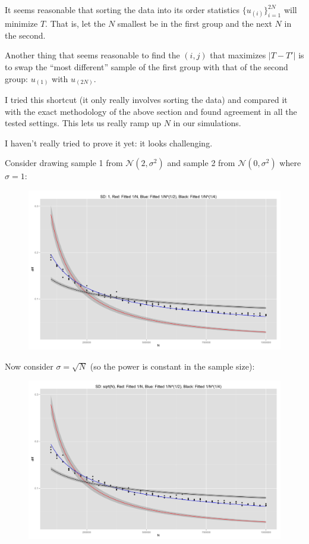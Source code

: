 It seems reasonable that sorting the data into its order statistics
$\{u_{(i)}\}_{i=1}^{2N}$ will minimize $T$.  That is, let the $N$
smallest be in the first group and the next $N$ in the second.

Another thing that seems reasonable to find the $(i, j)$ that maximizes
$|T - T'|$ is to swap the ``most different'' sample of the first group
with that of the second group: $u_{(1)}$ with $u_{(2N)}$.

I tried this shortcut (it only really involves sorting the data) and
compared it with the exact methodology of the above section and found
agreement in all the tested settings.  This lets us really ramp up $N$
in our simulations.

I haven't really tried to prove it yet: it looks challenging.

Consider drawing sample 1 from $\mathcal{N}(2, \sigma^2)$ and sample 2
from $\mathcal{N}(0, \sigma^2)$ where $\sigma = 1$:
\begin{figure}[!ht]
  \centering
  \includegraphics[scale=.06]{./simulations/better_bound_condition/rate_plot_1.png}
\end{figure}

Now consider $\sigma = \sqrt{N}$ (so the power is constant in the
sample size):
\begin{figure}[!ht]
  \centering
  \includegraphics[scale=.06]{./simulations/better_bound_condition/rate_plot_2.png}
\end{figure}

